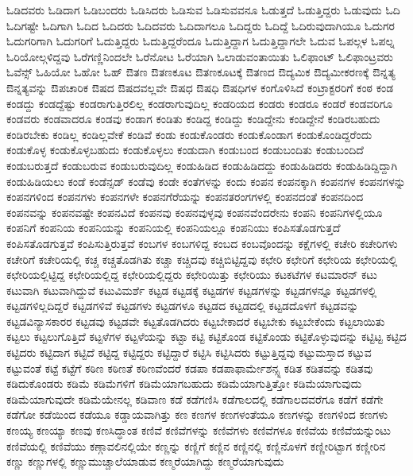 {ಓಡಿದವರು
ಓಡಿದಾಗ
ಓಡಿಬಂದರು
ಓಡಿಸಿದರು
ಓಡಿಸುವ
ಓಡಿಸುವವನೂ
ಓಡುತ್ತದೆ
ಓಡುತ್ತಿದ್ದರು
ಓಡುವುದು
ಓದಿ
ಓದಿಗಷ್ಟೇ
ಓದಿಗಾಗಿ
ಓದಿದ
ಓದಿದರು
ಓದಿದವರು
ಓದಿದಾಗಲೂ
ಓದಿದ್ದರು
ಓದಿದ್ದೆ
ಓದಿರುವುದಾಗಿಯೂ
ಓದುಗರ
ಓದುಗರಿಗಾಗಿ
ಓದುಗರಿಗೆ
ಓದುತ್ತಿದ್ದರು
ಓದುತ್ತಿದ್ದರೆಂದೂ
ಓದುತ್ತಿದ್ದಾಗ
ಓದುತ್ತಿದ್ದಾಗಲೇ
ಓದುವ
ಓಪಲ್ಗಳ
ಓಪಲ್ನ
ಓರಿಯೋಲ್ಗಳಿದ್ದವು
ಓರೆಗಣ್ಣಿನಿಂದಲೇ
ಓರೆನೋಟ
ಓರೆಯಾಗಿ
ಓಲಾಡುವಂತಾಯಿತು
ಓಲಿಫಾಂಟ್
ಓಲಿಫಾಂಟ್ರವರು
ಓವೆನ್ಸ್
ಓಹಿಯೋ
ಓಹೋ
ಓಹ್
ಔತಣ
ಔತಣಕೂಟ
ಔತಣಕೂಟಕ್ಕೆ
ಔತಣದ
ಔದ್ಯಮಿಕ
ಔದ್ಯಮೀಕರಣಕ್ಕೆ
ಔನ್ನತ್ಯ
ಔನ್ನತ್ಯವನ್ನು
ಔಪಚಾರಿಕ
ಔಷದ
ಔಷದವಲ್ಲವೇ
ಔಷಧ
ಔಷಧಿ
ಔಷಧಿಗಳ
ಕಂಗೊಳಿಸಿದೆ
ಕಂಟ್ರಾಕ್ಟರರಿಗೆ
ಕಂಠ
ಕಂಡ
ಕಂಡದ್ದು
ಕಂಡದ್ದೆಷ್ಟು
ಕಂಡರಾಗುತ್ತಿರಲಿಲ್ಲ
ಕಂಡರಾಗುವುದಿಲ್ಲ
ಕಂಡರಿಯದ
ಕಂಡರು
ಕಂಡರೂ
ಕಂಡರೆ
ಕಂಡವರಿಗೂ
ಕಂಡವರು
ಕಂಡವಾದರೂ
ಕಂಡವು
ಕಂಡಾಗ
ಕಂಡಿತು
ಕಂಡಿದ್ದ
ಕಂಡಿದ್ದು
ಕಂಡಿದ್ದೇನು
ಕಂಡಿದ್ದೇನೆ
ಕಂಡಿರಬಹುದು
ಕಂಡಿರಬೇಕು
ಕಂಡಿಲ್ಲ
ಕಂಡಿಲ್ಲವೇಕೆ
ಕಂಡಿವೆ
ಕಂಡು
ಕಂಡುಕೊಂಡರು
ಕಂಡುಕೊಂಡಾಗ
ಕಂಡುಕೊಂಡಿದ್ದರೆಂದು
ಕಂಡುಕೊಳ್ಳ
ಕಂಡುಕೊಳ್ಳಬಹುದು
ಕಂಡುಕೊಳ್ಳಲು
ಕಂಡುದಾಗಿ
ಕಂಡುಬಂದ
ಕಂಡುಬಂದಿತು
ಕಂಡುಬಂದಿದೆ
ಕಂಡುಬರುತ್ತದೆ
ಕಂಡುಬರುವ
ಕಂಡುಬರುವುದಿಲ್ಲ
ಕಂಡುಹಿಡಿದ
ಕಂಡುಹಿಡಿದದ್ದು
ಕಂಡುಹಿಡಿದರು
ಕಂಡುಹಿಡಿದ್ದಿದ್ದಾಗಿ
ಕಂಡುಹಿಡಿಯಲು
ಕಂಡೆ
ಕಂಡೆನ್ಸಡ್
ಕಂಡೆವು
ಕಂಡೇ
ಕಂತೆಗಳನ್ನು
ಕಂದು
ಕಂಪನ
ಕಂಪನಕ್ಕಾಗಿ
ಕಂಪನಗಳ
ಕಂಪನಗಳನ್ನು
ಕಂಪನಗಳಿಂದ
ಕಂಪನಗಳು
ಕಂಪನಗಳೇ
ಕಂಪನಗೆರೆಯನ್ನು
ಕಂಪನತರಂಗಗಳಲ್ಲಿ
ಕಂಪನದಂತೆ
ಕಂಪನದಿಂದ
ಕಂಪನವನ್ನು
ಕಂಪನವಷ್ಟೇ
ಕಂಪನವಿದೆ
ಕಂಪನವು
ಕಂಪನವುಳ್ಳವು
ಕಂಪನವೆಂದರೇನು
ಕಂಪನಿ
ಕಂಪನಿಗಳಲ್ಲಿಯೂ
ಕಂಪನಿಗೆ
ಕಂಪನಿಯ
ಕಂಪನಿಯನ್ನು
ಕಂಪನಿಯಲ್ಲಿ
ಕಂಪನಿಯಲ್ಲೂ
ಕಂಪನಿಯು
ಕಂಪಿಸತೊಡಗುತ್ತದೆ
ಕಂಪಿಸತೊಡಗುತ್ತವೆ
ಕಂಪಿಸುತ್ತಿರುತ್ತವೆ
ಕಂಬಗಳ
ಕಂಬಗಳಿದ್ದ
ಕಂಬದ
ಕಂಬವೊಂದನ್ನು
ಕಕ್ಷೆಗಳಲ್ಲಿ
ಕಚೇರಿ
ಕಚೇರಿಗಳು
ಕಚೇರಿಗೆ
ಕಚೇರಿಯಲ್ಲಿ
ಕಚ್ಚ
ಕಚ್ಚತೊಡಗಿತು
ಕಚ್ಚಾ
ಕಚ್ಚಿದವು
ಕಚ್ಚಿಬಿಟ್ಟಿದ್ದವು
ಕಛೇರಿ
ಕಛೇರಿಗೆ
ಕಛೇರಿಯ
ಕಛೇರಿಯಲ್ಲಿ
ಕಛೇರಿಯಲ್ಲಿಟ್ಟಿದ್ದ
ಕಛೇರಿಯಲ್ಲಿದ್ದ
ಕಛೇರಿಯಲ್ಲಿದ್ದರು
ಕಛೇರಿಯಿತ್ತು
ಕಛೇರಿಯು
ಕಟಕಟೆಗಳ
ಕಟಮಾರನ್
ಕಟು
ಕಟುವಾಗಿ
ಕಟುವಾಗಿದ್ದುವೆ
ಕಟುವಿಮರ್ಶೆ
ಕಟ್ಟಡ
ಕಟ್ಟಡಕ್ಕೆ
ಕಟ್ಟಡಗಳ
ಕಟ್ಟಡಗಳನ್ನು
ಕಟ್ಟಡಗಳನ್ನೂ
ಕಟ್ಟಡಗಳಲ್ಲಿ
ಕಟ್ಟಡಗಳಿಲ್ಲದಿದ್ದರೆ
ಕಟ್ಟಡಗಳಿವೆ
ಕಟ್ಟಡಗಳು
ಕಟ್ಟಡಗಳೂ
ಕಟ್ಟಡದ
ಕಟ್ಟಡದಲ್ಲಿ
ಕಟ್ಟಡದೊಳಗೆ
ಕಟ್ಟಡವನ್ನು
ಕಟ್ಟಡವಿನ್ಯಾಸಕಾರರ
ಕಟ್ಟಡವು
ಕಟ್ಟಡವೇ
ಕಟ್ಟತೊಡಗಿದರು
ಕಟ್ಟಬೇಕಾದರೆ
ಕಟ್ಟಬೇಕು
ಕಟ್ಟಬೇಕೆಂದು
ಕಟ್ಟಲಾಯಿತು
ಕಟ್ಟಲು
ಕಟ್ಟಲುಗೊತ್ತಿದೆ
ಕಟ್ಟಳೆಗಳ
ಕಟ್ಟಳೆಯನ್ನು
ಕಟ್ಟಾ
ಕಟ್ಟಿ
ಕಟ್ಟಿಕೊಂಡ
ಕಟ್ಟಿಕೊಂಡು
ಕಟ್ಟಿಕೊಳ್ಳುವುದನ್ನು
ಕಟ್ಟಿಟ್ಟ
ಕಟ್ಟಿದ
ಕಟ್ಟಿದರು
ಕಟ್ಟಿದಾಗ
ಕಟ್ಟಿದೆ
ಕಟ್ಟಿದ್ದ
ಕಟ್ಟಿದ್ದರು
ಕಟ್ಟಿದ್ದಾರೆ
ಕಟ್ಟಿಸಿ
ಕಟ್ಟಿಸಿದರು
ಕಟ್ಟುತ್ತಿದ್ದವು
ಕಟ್ಟುಮಸ್ತಾದ
ಕಟ್ಟುವ
ಕಟ್ಟುವಂತೆ
ಕಟ್ಟೆ
ಕಟ್ಟೆಗೆ
ಕಠಿಣ
ಕಠಿಣತೆ
ಕಠಿಣವೆಂದರೆ
ಕಡಪಾ
ಕಡಪಾಫಾರ್ಮೇಶನ್ಸ್ನ
ಕಡಿತ
ಕಡಿತವನ್ನು
ಕಡಿತವು
ಕಡಿದುಕೊಂಡರು
ಕಡಿಮೆ
ಕಡಿಮೆಗಳಿಗೆ
ಕಡಿಮೆಯಾಗಬಹುದು
ಕಡಿಮೆಯಾಗುತ್ತಿತ್ತೋ
ಕಡಿಮೆಯಾಗುವುದು
ಕಡಿಮೆಯಾಗುವುದೇ
ಕಡಿಮೆಯೇನಲ್ಲ
ಕಡಿವಾಣ
ಕಡೆ
ಕಡೆಗಣಿಸಿ
ಕಡೆಗಾಲದಲ್ಲಿ
ಕಡೆಗಾಲದವರೆಗೂ
ಕಡೆಗೆ
ಕಡೆಗೇ
ಕಡೆಗೋ
ಕಡೆಯಿಂದ
ಕಡೆಯೂ
ಕಡ್ಡಾಯವಾಗಿತ್ತು
ಕಣ
ಕಣಗಳ
ಕಣಗಳಂತೆಯೂ
ಕಣಗಳನ್ನು
ಕಣಗಳಿಂದ
ಕಣಗಳು
ಕಣಯ್ಯ
ಕಣಯ್ಯಾ
ಕಣವು
ಕಣಸಿದ್ಧಾಂತ
ಕಣಿವೆ
ಕಣಿವೆಗಳನ್ನು
ಕಣಿವೆಗಳು
ಕಣಿವೆಗಳೂ
ಕಣಿವೆಯ
ಕಣಿವೆಯನ್ನುಂಟು
ಕಣಿವೆಯಲ್ಲಿ
ಕಣಿವೆಯು
ಕಣ್ಗಾವಲಿನಲ್ಲಿಯೇ
ಕಣ್ಣನ್ನು
ಕಣ್ಣಿಗೆ
ಕಣ್ಣಿನ
ಕಣ್ಣಿನಲ್ಲಿ
ಕಣ್ಣಿನೊಳಗೆ
ಕಣ್ಣೀರಿಟ್ಟಾಗ
ಕಣ್ಣೀರಿನ
ಕಣ್ಣು
ಕಣ್ಣುಗಳಲ್ಲಿ
ಕಣ್ಣುಮುಚ್ಚಾಲೆಯಾಡುವ
ಕಣ್ಮರೆಯಾಗಿದ್ದು
ಕಣ್ಮರೆಯಾಗುವುದು
}
